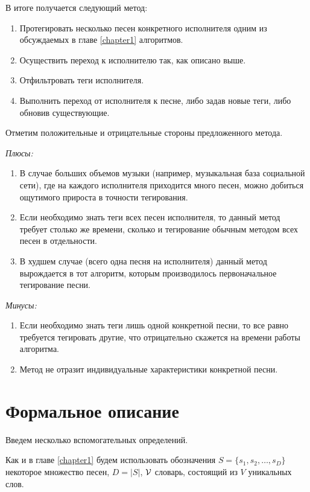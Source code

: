 В итоге получается следующий метод:
\begin{enumerate}
 \item Протегировать несколько песен конкретного исполнителя одним из обсуждаемых в главе \ref{chapter1} алгоритмов.
 \item Осуществить переход к исполнителю так, как описано выше.
 \item Отфильтровать теги исполнителя.
 \item Выполнить переход от исполнителя к песне, либо задав новые теги, либо обновив существующие.
\end{enumerate}

Отметим положительные и отрицательные стороны предложенного метода.

\emph{Плюсы:} 
\begin{enumerate}
 \item В случае больших объемов музыки (например, музыкальная база социальной сети), где на каждого исполнителя приходится много песен, можно добиться ощутимого прироста в точности тегирования.
 \item Если необходимо знать теги всех песен исполнителя, то данный метод требует столько же времени, сколько и тегирование обычным методом всех песен в отдельности.
 \item В худшем случае (всего одна песня на исполнителя) данный метод вырождается в тот алгоритм, которым производилось первоначальное тегирование песни.
\end{enumerate}

\emph{Минусы:} 
\begin{enumerate}
 \item Если необходимо знать теги лишь одной конкретной песни, то все равно требуется тегировать другие, что отрицательно скажется на времени работы алгоритма.
 \item Метод не отразит индивидуальные характеристики конкретной песни.
\end{enumerate}

\section{Формальное описание}

Введем несколько вспомогательных определений.

Как и в главе \ref{chapter1} будем использовать обозначения $S = \{s_1, s_2, \ldots, s_D \}$ \ld некоторое множество песен, $D = |S|$, $ \mathcal{V} $ \ld словарь, состоящий из $V$ уникальных слов.

